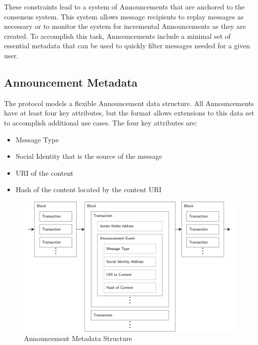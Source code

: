 \documentclass[12pt,letterpaper]{article}
\providecommand{\tightlist}{%
\setlength{\itemsep}{0pt}\setlength{\parskip}{0pt}}
\begin{document}
These constraints lead to a system of Announcements that are anchored to the consensus
system.  This system allows message recipients to replay messages as necessary or to monitor
the system for incremental Announcements as they are created. To accomplish this task,
Announcements include a minimal set of essential metadata that can be used to quickly filter
messages needed for a given user.

\subsection{Announcement Metadata}\label{sec:announcement_metadata}

The protocol models a flexible Announcement data structure. All Announcements have at least
four key attributes, but the format allows extensions to this data set to accomplish
additional use cases. The four key attributes are:

\begin{samepage}
	\begin{itemize}
		\tightlist
		\item
		      Message Type
		\item
		      Social Identity that is the source of the message
		\item
		      URI of the content
		\item
		      Hash of the content located by the content URI
	\end{itemize}
\end{samepage}

\begin{figure}
	\includegraphics[width=\linewidth]{figures/Announcement Metadata Structure.png}
	\caption{Announcement Metadata Structure}
	\label{fig:5}
\end{figure}
\end{document}
